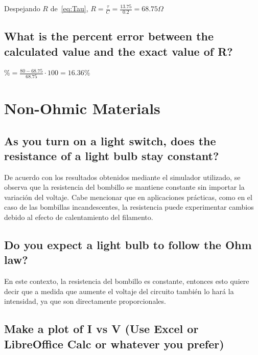 \documentclass[twocolumn, 12pt]{article}
\begin{document}
Despejando $R$ de~\eqref{eq:Tau}, $R = \frac{\tau}{C} =
    \frac{13.75}{0.2} = 68.75 \Omega$

\subsection{What is the percent error between the calculated value and the exact value of R?}

$\% = \frac{80 - 68.75}{68.75} \cdot 100 = 16.36\%$

\section{Non-Ohmic Materials}

\subsection{As you turn on a light switch, does the resistance of a light bulb stay constant?}

De acuerdo con los resultados obtenidos mediante el
simulador utilizado, se observa que la resistencia del
bombillo se mantiene constante sin importar la variación
del voltaje. Cabe mencionar que en aplicaciones prácticas,
como en el caso de las bombillas incandescentes, la
resistencia puede experimentar cambios debido al efecto de
calentamiento del filamento.

\subsection{Do you expect a light bulb to follow the Ohm law?}

\nocite{prezi.com}

En este contexto, la resistencia del bombillo es constante,
entonces esto quiere decir que a medida que aumente el
voltaje del circuito también lo hará la intensidad, ya que
son directamente proporcionales.

\subsection*{Make a plot of I vs V (Use Excel or LibreOffice Calc or whatever you prefer)}
\end{document}
